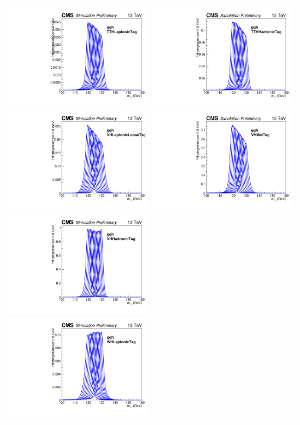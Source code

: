 \begin{figure}[ht!]
\centering
\includegraphics[width=0.33\textwidth]{modellingFigures/DCBpG/ggh_TTHLeptonicTag_fmc_interp.pdf} 
\includegraphics[width=0.33\textwidth]{modellingFigures/DCBpG/ggh_TTHHadronicTag_fmc_interp.pdf}\\ 
\includegraphics[width=0.33\textwidth]{modellingFigures/DCBpG/ggh_VHLeptoniclooseTag_fmc_interp.pdf} 
\includegraphics[width=0.33\textwidth]{modellingFigures/DCBpG/ggh_VHMetTag_fmc_interp.pdf} 
\includegraphics[width=0.33\textwidth]{modellingFigures/DCBpG/ggh_VHHadronicTag_fmc_interp.pdf} \\
\includegraphics[width=0.33\textwidth]{modellingFigures/DCBpG/ggh_WHLeptonicTag_fmc_interp.pdf} 

\end{figure}
